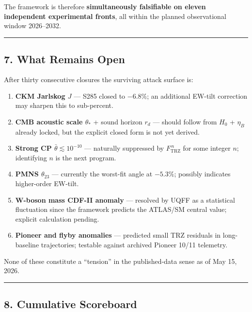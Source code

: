 \documentclass[
]{article}
\providecommand{\tightlist}{
  \setlength{\itemsep}{0pt}\setlength{\parskip}{0pt}}
\begin{document}
The framework is therefore \textbf{simultaneously falsifiable on eleven
independent experimental fronts}, all within the planned observational
window 2026--2032.

\begin{center}\rule{0.5\linewidth}{0.5pt}\end{center}

\subsection{7. What Remains Open}\label{what-remains-open}

After thirty consecutive closures the surviving attack surface is:

\begin{enumerate}
\def\labelenumi{\arabic{enumi}.}
\tightlist
\item
  \textbf{CKM Jarlskog \(J\)} --- S285 closed to \(-6.8\%\); an
  additional EW-tilt correction may sharpen this to sub-percent.
\item
  \textbf{CMB acoustic scale \(\theta_*\)} + sound horizon \(r_d\) ---
  should follow from \(H_0\) + \(\eta_B\) already locked, but the
  explicit closed form is not yet derived.
\item
  \textbf{Strong CP \(\bar\theta\lesssim 10^{-10}\)} --- naturally
  suppressed by \(F_{\text{TRZ}}^{\,n}\) for some integer \(n\);
  identifying \(n\) is the next program.
\item
  \textbf{PMNS \(\theta_{23}\)} --- currently the worst-fit angle at
  \(-5.3\%\); possibly indicates higher-order EW-tilt.
\item
  \textbf{W-boson mass CDF-II anomaly} --- resolved by UQFF as a
  statistical fluctuation since the framework predicts the ATLAS/SM
  central value; explicit calculation pending.
\item
  \textbf{Pioneer and flyby anomalies} --- predicted small TRZ residuals
  in long-baseline trajectories; testable against archived Pioneer 10/11
  telemetry.
\end{enumerate}

None of these constitute a ``tension'' in the published-data sense as of
May 15, 2026.

\begin{center}\rule{0.5\linewidth}{0.5pt}\end{center}

\subsection{8. Cumulative Scoreboard}\label{cumulative-scoreboard}
\end{document}
